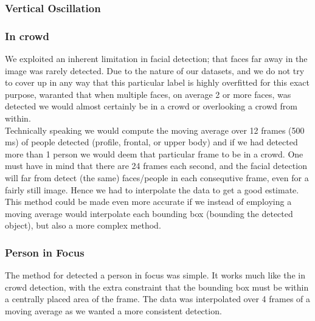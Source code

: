 \subsubsection{Vertical Oscillation}
%

%
\subsubsection{In crowd}
%
We exploited an inherent limitation in facial detection; that faces far away in the image was rarely detected. Due to the nature of our datasets, and we do not try to cover up in any way that this particular label is highly overfitted for this exact purpose, waranted that when multiple faces, on average 2 or more faces, was detected we would almost certainly be in a crowd or overlooking a crowd from within.\\
Technically speaking we would compute the moving average over 12 frames (500 ms) of people detected (profile, frontal, or upper body) and if we had detected more than 1 person we would deem that particular frame to be in a crowd. One must have in mind that there are 24 frames each second, and the facial detection will far from detect (the same) faces/people in each consequtive frame, even for a fairly still image. Hence we had to interpolate the data to get a good estimate.\\
This method could be made even more accurate if we instead of employing a moving average would interpolate each bounding box (bounding the detected object), but also a more complex method.
%
\subsubsection{Person in Focus}
%
The method for detected a person in focus was simple. It works much like the in crowd detection, with the extra constraint that the bounding box must be within a centrally placed area of the frame. The data was interpolated over 4 frames of a moving average as we wanted a more consistent detection.
%
